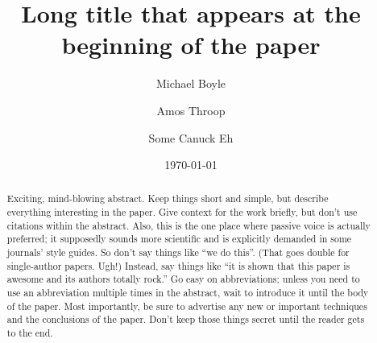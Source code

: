 \documentclass[reprint, aps, prd, letterpaper, noshowpacs, amsmath, %
amssymb, amsfonts, nofootinbib, floatfix, superscriptaddress, %
twoside]{revtex4-1}
\begin{document}

\graphicspath{%
  {Plots/}%
}

\title[Short title appearing in subsequent headers] {Long title that
  appears at the beginning of the paper}

\makeatletter
\@booleantrue\frontmatterverbose@sw
\makeatother

\author{Michael Boyle} \Cornell
\author{Amos Throop} \Caltech
\author{Some Canuck Eh} \CITA

\date{\today}

\begin{abstract}
  Exciting, mind-blowing abstract.  Keep things short and simple, but
  describe everything interesting in the paper.  Give context for the
  work briefly, but don't use citations within the abstract.  Also,
  this is the one place where passive voice is actually preferred; it
  supposedly sounds more scientific and is explicitly demanded in some
  journals' style guides.  So don't say things like ``we do this''.
  (That goes double for single-author papers.  Ugh!)  Instead, say
  things like ``it is shown that this paper is awesome and its authors
  totally rock.''  Go easy on abbreviations; unless you need to use an
  abbreviation multiple times in the abstract, wait to introduce it
  until the body of the paper.  Most importantly, be sure to advertise
  any new or important techniques and the conclusions of the paper.
  Don't keep those things secret until the reader gets to the end.
\end{abstract}



\maketitle
\end{document}
